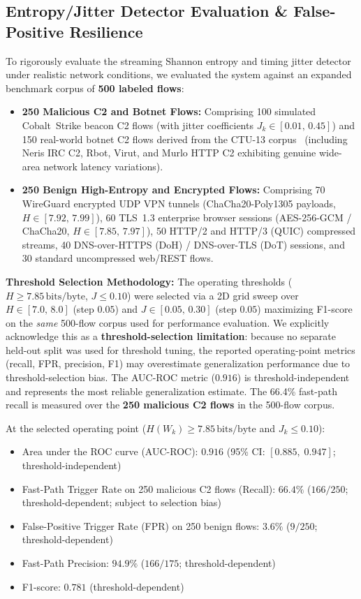 \documentclass[journal]{IEEEtran}
\renewcommand{\_}{\textunderscore\allowbreak}
\begin{document}
\subsection{Entropy/Jitter Detector Evaluation \& False-Positive Resilience}
To rigorously evaluate the streaming Shannon entropy and timing jitter detector under realistic network conditions, we evaluated the system against an expanded benchmark corpus of \textbf{500 labeled flows}:
\begin{itemize}
  \item \textbf{250 Malicious C2 and Botnet Flows:} Comprising 100 simulated Cobalt~Strike beacon C2 flows (with jitter coefficients $J_k \in [0.01,\, 0.45]$) and 150 real-world botnet C2 flows derived from the CTU-13 corpus~\cite{garcia2014empirical} (including Neris IRC C2, Rbot, Virut, and Murlo HTTP C2 exhibiting genuine wide-area network latency variations).
  \item \textbf{250 Benign High-Entropy and Encrypted Flows:} Comprising 70 WireGuard encrypted UDP VPN tunnels (ChaCha20-Poly1305 payloads, $H \in [7.92,\, 7.99]$), 60 TLS~1.3 enterprise browser sessions (AES-256-GCM / ChaCha20, $H \in [7.85,\, 7.97]$), 50 HTTP/2 and HTTP/3 (QUIC) compressed streams, 40 DNS-over-HTTPS (DoH) / DNS-over-TLS (DoT) sessions, and 30 standard uncompressed web/REST flows.
\end{itemize}

\textbf{Threshold Selection Methodology:}
The operating thresholds ($H \ge 7.85\,\text{bits/byte}$, $J \le 0.10$) were selected via a 2D grid sweep over
$H \in [7.0,\, 8.0]$ (step $0.05$) and $J \in [0.05,\, 0.30]$ (step $0.05$) maximizing F1-score on the
\emph{same} 500-flow corpus used for performance evaluation. We explicitly acknowledge this as a \textbf{threshold-selection
limitation}: because no separate held-out split was used for threshold tuning, the reported operating-point
metrics (recall, FPR, precision, F1) may overestimate generalization performance due to threshold-selection bias.
The AUC-ROC metric ($0.916$) is threshold-independent and represents the most reliable generalization estimate.
The 66.4\% fast-path recall is measured over the \textbf{250 malicious C2 flows} in the 500-flow corpus.

At the selected operating point ($H(W_k) \ge 7.85\,\text{bits/byte}$ and $J_k \le 0.10$):
\begin{itemize}
  \item Area under the ROC curve (AUC-ROC): $\mathbf{0.916}$ (95\% CI: $[0.885,\; 0.947]$; threshold-independent)
  \item Fast-Path Trigger Rate on 250 malicious C2 flows (Recall): $66.4\%$ ($166/250$; threshold-dependent; subject to selection bias)
  \item False-Positive Trigger Rate (FPR) on 250 benign flows: $3.6\%$ ($9/250$; threshold-dependent)
  \item Fast-Path Precision: $94.9\%$ ($166/175$; threshold-dependent)
  \item F1-score: $0.781$ (threshold-dependent)
\end{itemize}
\end{document}
